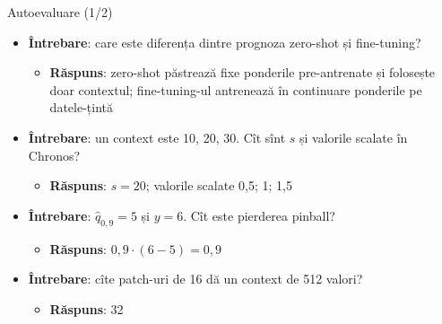 \begin{frame}{Autoevaluare (1/2)}
\itemsize{\small}
\begin{itemize}
    \item \textbf{Întrebare}: care este diferența dintre prognoza zero-shot și fine-tuning?
    \begin{itemize}
        \item \textbf{Răspuns}: zero-shot păstrează fixe ponderile pre-antrenate și folosește doar contextul; fine-tuning-ul antrenează în continuare ponderile pe datele-țintă
    \end{itemize}
    \item \textbf{Întrebare}: un context este 10, 20, 30. Cît sînt $s$ și valorile scalate în Chronos?
    \begin{itemize}
        \item \textbf{Răspuns}: $s = 20$; valorile scalate 0,5; 1; 1,5
    \end{itemize}
    \item \textbf{Întrebare}: $\hat q_{0{,}9} = 5$ și $y = 6$. Cît este pierderea pinball?
    \begin{itemize}
        \item \textbf{Răspuns}: $0{,}9 \cdot (6 - 5) = 0{,}9$
    \end{itemize}
    \item \textbf{Întrebare}: cîte patch-uri de 16 dă un context de 512 valori?
    \begin{itemize}
        \item \textbf{Răspuns}: 32
    \end{itemize}
\end{itemize}
\end{frame}

